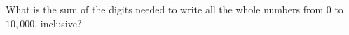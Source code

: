 What is the sum of the digits needed to write all the whole numbers from $0$ to $10{,}000$, inclusive?
